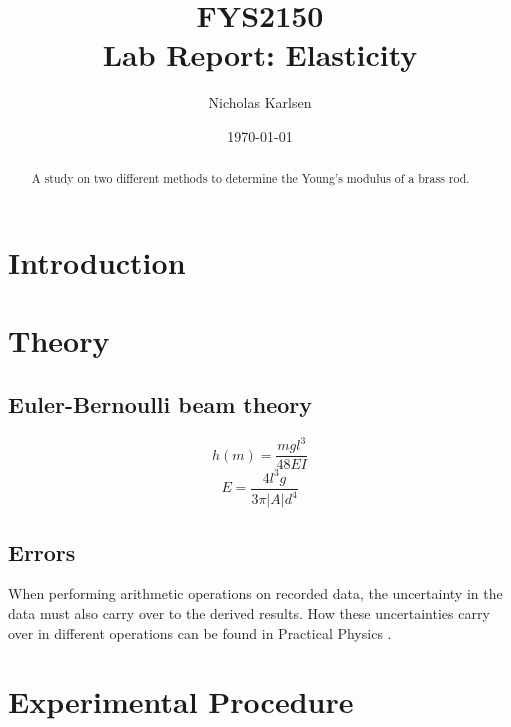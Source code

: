 \documentclass[11pt,a4paper]{article}
\begin{document}

\title{FYS2150 \\ Lab Report: Elasticity}%

\author{Nicholas Karlsen}

\date{\today}%

\maketitle

\begin{abstract}
    A study on two different methods to determine the Young's modulus of a brass rod.
\end{abstract}


\section{\label{sect:intro}Introduction}
    
\section{\label{sect:theory}Theory}
  \subsection{Euler-Bernoulli beam theory}
  \begin{equation}
    h(m) = \frac{mgl^3}{48EI}
  \end{equation}
  \begin{equation}
    E = \frac{4l^3g}{3\pi |A|d^4}
  \end{equation}
  \subsection{Errors}
    When performing arithmetic operations on recorded data, the uncertainty in the data must also carry over to the derived results. How these uncertainties carry over in different operations can be found in Practical Physics \cite{squires}.

\section{\label{section:experimental}Experimental Procedure}
\end{document}
